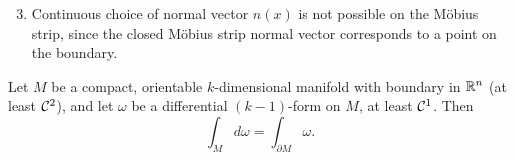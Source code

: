 \begin{enumerate}[label=(\alph*)] \setcounter{enumi}{2}
    \item Continuous choice of normal vector $n(x)$ is not possible on the M\"obius strip, since the closed M\"obius strip normal vector corresponds to a point on the boundary.
\end{enumerate}
\begin{simplethm}
    Let $M$ be a compact, orientable $k$-dimensional manifold with boundary in $\mathbb R^n$ (at least $\mathcal C^2$), and let $\omega$ be a differential $(k-1)$-form on $M$, at least $\mathcal C^1$. Then
    \[ \int_M d\omega = \int_{\partial M} \omega. \]
\end{simplethm}
